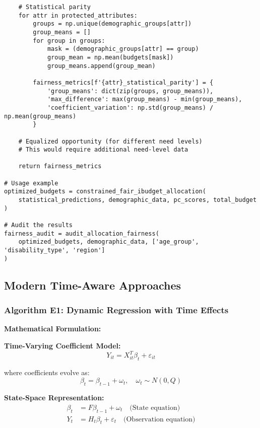 \begin{lstlisting}
    # Statistical parity
    for attr in protected_attributes:
        groups = np.unique(demographic_groups[attr])
        group_means = []
        for group in groups:
            mask = (demographic_groups[attr] == group)
            group_mean = np.mean(budgets[mask])
            group_means.append(group_mean)
        
        fairness_metrics[f'{attr}_statistical_parity'] = {
            'group_means': dict(zip(groups, group_means)),
            'max_difference': max(group_means) - min(group_means),
            'coefficient_variation': np.std(group_means) / np.mean(group_means)
        }
    
    # Equalized opportunity (for different need levels)
    # This would require additional need-level data
    
    return fairness_metrics

# Usage example
optimized_budgets = constrained_fair_ibudget_allocation(
    statistical_predictions, demographic_data, pc_scores, total_budget
)

# Audit the results
fairness_audit = audit_allocation_fairness(
    optimized_budgets, demographic_data, ['age_group', 'disability_type', 'region']
)
\end{lstlisting}

\subsection{Modern Time-Aware Approaches}

\subsubsection{Algorithm E1: Dynamic Regression with Time Effects}

\textbf{Mathematical Formulation:}

\textbf{Time-Varying Coefficient Model:}
\begin{equation}
Y_{it} = X_{it}^T \beta_t + \varepsilon_{it}
\end{equation}

where coefficients evolve as:
\begin{equation}
\beta_t = \beta_{t-1} + \omega_t, \quad \omega_t \sim N(0, Q)
\end{equation}

\textbf{State-Space Representation:}
\begin{align}
\beta_t &= F\beta_{t-1} + \omega_t \quad \text{(State equation)} \\
Y_t &= H_t\beta_t + \varepsilon_t \quad \text{(Observation equation)}
\end{align}

